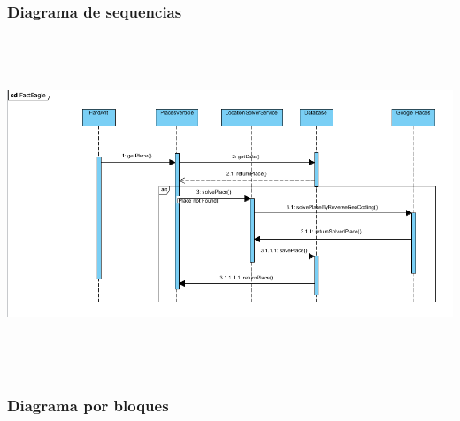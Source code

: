    \subsubsection{Diagrama de sequencias}
    \begin{center}
      \includegraphics[width=16cm,height=10cm]{./images/FastEagleSequenceDiagram}
    \end{center}

    \subsubsection{Diagrama por bloques}
